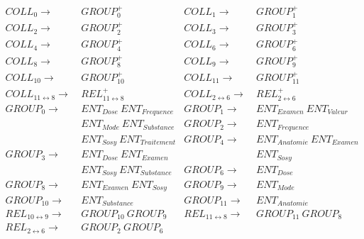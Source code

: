 \begin{align*}
    COLL_0                      \to & ~ GROUP_0^+                    & COLL_1                     \to & ~ GROUP_1^+                     \\
    COLL_2                      \to & ~ GROUP_2^+                    & COLL_3                     \to & ~ GROUP_3^+                     \\
    COLL_4                      \to & ~ GROUP_4^+                    & COLL_6                     \to & ~ GROUP_6^+                     \\
    COLL_8                      \to & ~ GROUP_8^+                    & COLL_9                     \to & ~ GROUP_9^+                     \\
    COLL_{10}                   \to & ~ GROUP_{10}^+                 & COLL_{11}                  \to & ~ GROUP_{11}^+                  \\
    COLL_{11 \leftrightarrow 8} \to & ~ REL_{11 \leftrightarrow 8}^+ & COLL_{2 \leftrightarrow 6} \to & ~ REL_{2 \leftrightarrow 6}^+   \\
    GROUP_0                     \to & ~ ENT_{Dose} ~ ENT_{Frequence} & GROUP_1                    \to & ~ ENT_{Examen} ~ ENT_{Valeur}   \\
                                    & ~ ENT_{Mode} ~ ENT_{Substance}   & GROUP_2                    \to & ~ ENT_{Frequence}               \\
                                    & ~ ENT_{Sosy} ~ ENT_{Traitement}  & GROUP_4                    \to & ~ ENT_{Anatomie} ~ ENT_{Examen} \\
    GROUP_3                     \to & ~ ENT_{Dose} ~ ENT_{Examen}    &                                & ~ ENT_{Sosy}                      \\
                                    & ~ ENT_{Sosy} ~ ENT_{Substance}   & GROUP_6                    \to & ~ ENT_{Dose}                    \\
    GROUP_8                     \to & ~ ENT_{Examen} ~ ENT_{Sosy}    & GROUP_9                    \to & ~ ENT_{Mode}                    \\
    GROUP_{10}                  \to & ~ ENT_{Substance}              & GROUP_{11}                 \to & ~ ENT_{Anatomie}                \\
    REL_{10 \leftrightarrow 9}  \to & ~ GROUP_{10} ~ GROUP_9         & REL_{11 \leftrightarrow 8} \to & ~ GROUP_{11} ~ GROUP_8          \\
    REL_{2 \leftrightarrow 6}   \to & ~ GROUP_2 ~ GROUP_6
\end{align*}


